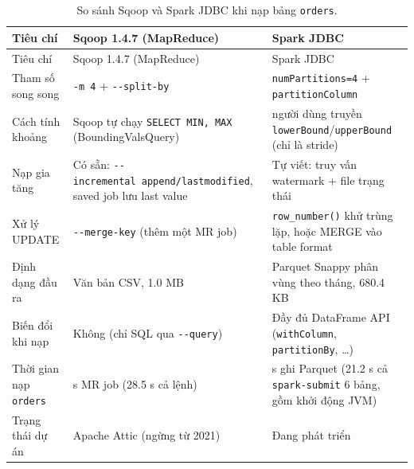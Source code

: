 \documentclass[
  12pt,
  a4paper,
]{article}
\begin{document}
\begin{longtable}[]{@{}
  >{\raggedright\arraybackslash}p{}
  >{\raggedright\arraybackslash}p{}
  >{\raggedright\arraybackslash}p{}@{}}
\caption{\label{tbl:l04-compare}So sánh Sqoop và Spark JDBC khi nạp bảng
\texttt{orders}.}\tabularnewline
\toprule\noalign{}
\begin{minipage}[b]{\linewidth}\raggedright
Tiêu chí
\end{minipage} & \begin{minipage}[b]{\linewidth}\raggedright
Sqoop 1.4.7 (MapReduce)
\end{minipage} & \begin{minipage}[b]{\linewidth}\raggedright
Spark JDBC
\end{minipage} \\
\midrule\noalign{}
\endfirsthead
\toprule\noalign{}
\begin{minipage}[b]{\linewidth}\raggedright
Tiêu chí
\end{minipage} & \begin{minipage}[b]{\linewidth}\raggedright
Sqoop 1.4.7 (MapReduce)
\end{minipage} & \begin{minipage}[b]{\linewidth}\raggedright
Spark JDBC
\end{minipage} \\
\midrule\noalign{}
\endhead
\bottomrule\noalign{}
\endlastfoot
Tham số song song & \texttt{-m\ 4} + \texttt{-\/-split-by} &
\texttt{numPartitions=4} + \texttt{partitionColumn} \\
Cách tính khoảng & Sqoop tự chạy \texttt{SELECT\ MIN,\ MAX}
(BoundingValsQuery) & người dùng truyền
\texttt{lowerBound}/\texttt{upperBound} (chỉ là stride) \\
Nạp gia tăng & Có sẵn:
\texttt{-\/-incremental\ append/}\allowbreak{}\texttt{lastmodified}\allowbreak{},
saved job lưu last value & Tự viết: truy vấn watermark + file trạng
thái \\
Xử lý UPDATE & \texttt{-\/-merge-key} (thêm một MR job) &
\texttt{row\_number()} khử trùng lặp, hoặc MERGE vào table format \\
Định dạng đầu ra & Văn bản CSV, 1.0 MB & Parquet Snappy phân vùng theo
tháng, 680.4 KB \\
Biến đổi khi nạp & Không (chỉ SQL qua \texttt{-\/-query}) & Đầy đủ
DataFrame API (\texttt{withColumn}, \texttt{partitionBy}, \ldots) \\
Thời gian nạp \texttt{orders} & 25.2 s MR job (28.5 s cả lệnh) & 3.10 s
ghi Parquet (21.2 s cả \texttt{spark-submit} 6 bảng, gồm khởi động
JVM) \\
Trạng thái dự án & Apache Attic (ngừng từ 2021) & Đang phát triển \\
\end{longtable}
\end{document}
